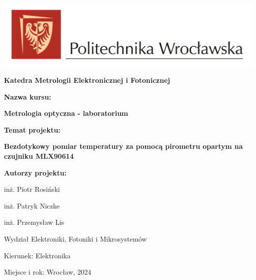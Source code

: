 \begin{titlepage}
    \centering
    \includegraphics[width=1\textwidth]{images/logo PWr kolor poziom}\par
    {\huge\bfseries Katedra Metrologii Elektronicznej i Fotonicznej\par}
    \vspace{1.5cm}
    {\Large\bfseries Nazwa kursu:\par}
    {\huge\bfseries Metrologia optyczna - laboratorium\par}
    \vspace{1.5cm}
    {\Large\bfseries Temat projektu:\par}
    {\huge\bfseries Bezdotykowy pomiar temperatury za pomocą pirometru opartym na czujniku MLX90614\par}
    \vspace{1.5cm}
    {\Large\bfseries Autorzy projektu:\par}
    \vspace{0.25cm}
    {\large inż. Piotr Rosiński\par}
    {\large inż. Patryk Niczke\par}
    {\large inż. Przemysław Lis\par}
    \vspace{1.5cm}
    {\large Wydział Elektroniki, Fotoniki i Mikrosystemów\par}
    {\large Kierunek: Elektronika\par}
    \vspace{1cm}
    {\large Miejsce i rok: Wrocław, 2024\par}
    \vspace*{\fill}
    \end{titlepage}